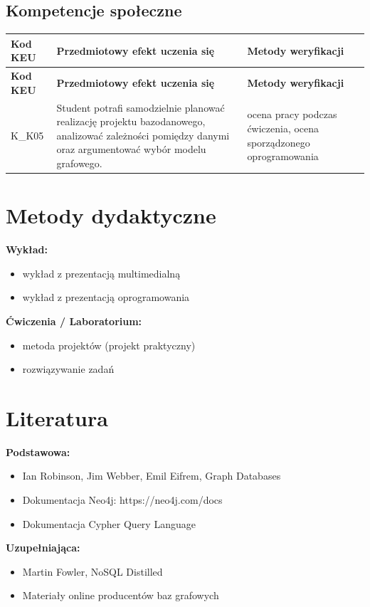 \documentclass[12pt, a4paper]{article}
\newcommand{\thdrule}{\noalign{\global\setlength{\extrarowheight}{0pt}}}
\newcommand{\thdend}{\noalign{\global\setlength{\extrarowheight}{3pt}}}
\begin{document}
\subsection*{Kompetencje społeczne}
{\scriptsize
\begin{longtable}{m{1.6cm}m{9.0cm}m{4.2cm}}
\thdrule\toprule
\rowcolor{pjatkRed} {\color{white}\footnotesize\textbf{\vphantom{Ag}Kod KEU}} & {\color{white}\footnotesize\textbf{\vphantom{Ag}Przedmiotowy efekt uczenia się}} & {\color{white}\footnotesize\textbf{\vphantom{Ag}Metody weryfikacji}} \\
\midrule\thdend
\endfirsthead
\thdrule\toprule
\rowcolor{pjatkRed} {\color{white}\footnotesize\textbf{\vphantom{Ag}Kod KEU}} & {\color{white}\footnotesize\textbf{\vphantom{Ag}Przedmiotowy efekt uczenia się}} & {\color{white}\footnotesize\textbf{\vphantom{Ag}Metody weryfikacji}} \\
\midrule\thdend
\endhead
  \rowcolor{tableRowLight} K\_K05 & Student potrafi samodzielnie planować realizację projektu bazodanowego, analizować zależności pomiędzy danymi oraz argumentować wybór modelu grafowego. & ocena pracy podczas ćwiczenia, ocena sporządzonego oprogramowania \\
\bottomrule
\end{longtable}}

\section{Metody dydaktyczne}

\textbf{Wykład:}
\begin{itemize}
  \item wykład z prezentacją multimedialną
  \item wykład z prezentacją oprogramowania
\end{itemize}
\vspace{4pt}
\textbf{Ćwiczenia / Laboratorium:}
\begin{itemize}
  \item metoda projektów (projekt praktyczny)
  \item rozwiązywanie zadań
\end{itemize}
\vspace{4pt}


\section{Literatura}

\textbf{Podstawowa:}
\begin{itemize}
  \item Ian Robinson, Jim Webber, Emil Eifrem, Graph Databases
  \item Dokumentacja Neo4j: https://neo4j.com/docs
  \item Dokumentacja Cypher Query Language
\end{itemize}

\textbf{Uzupełniająca:}
\begin{itemize}
  \item Martin Fowler, NoSQL Distilled
  \item Materiały online producentów baz grafowych
\end{itemize}
\end{document}
